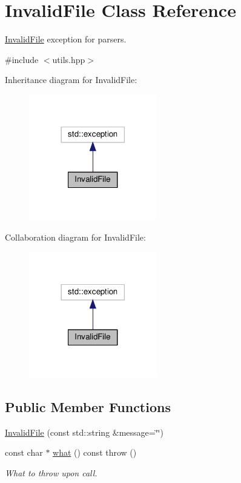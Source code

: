 \hypertarget{class_invalid_file}{}\section{Invalid\+File Class Reference}
\label{class_invalid_file}


\hyperlink{class_invalid_file}{Invalid\+File} exception for parsers.  




{\ttfamily \#include $<$utils.\+hpp$>$}



Inheritance diagram for Invalid\+File\+:
\nopagebreak
\begin{figure}[H]
\begin{center}
\leavevmode
\includegraphics[width=158pt]{class_invalid_file__inherit__graph}
\end{center}
\end{figure}


Collaboration diagram for Invalid\+File\+:
\nopagebreak
\begin{figure}[H]
\begin{center}
\leavevmode
\includegraphics[width=158pt]{class_invalid_file__coll__graph}
\end{center}
\end{figure}
\subsection*{Public Member Functions}
\begin{DoxyCompactItemize}
\item 
\hyperlink{class_invalid_file_ae8e9774922e4413b547b927678450403}{Invalid\+File} (const std\+::string \&message=\char`\"{}\char`\"{})
\item 
const char $\ast$ \hyperlink{class_invalid_file_a1652de4e9e153ed2bf68847b60fa97f4}{what} () const  throw ()
\begin{DoxyCompactList}\small\item\em What to throw upon call. \end{DoxyCompactList}\end{DoxyCompactItemize}


